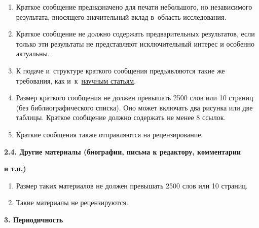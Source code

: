 \begin{enumerate} 

\item[1.] Краткое сообщение предназначено для печати небольшого, но независимого результата, вносящего значительный вклад в~область исследования.

\item[2.] Краткое сообщение не должно содержать предварительных результатов, если только эти результаты не представляют исключительный интерес и особенно актуальны.

\item[3.] К подаче и~структуре краткого сообщения предъявляются такие же требования, как и~к~\hyperlink{sectionPoliciesOriginalArticles}{научным статьям}.

\item[4.] Размер краткого сообщения не должен превышать 2500 слов или 10 страниц (без библиографического списка). Оно может включать два рисунка или две таблицы. Краткое сообщение должно содержать не менее 8 ссылок.



\item[5.] Краткие сообщения также отправляются на рецензирование.



\end{enumerate}



\pagebreak



{\bf 2.4. Другие материалы (биографии, письма к редактору, комментарии}



{\bf и т.п.)}



\begin{enumerate}

\item[1.] Размер таких материалов не должен превышать 2500 слов или 10 страниц.

\item[2.] Такие материалы не рецензируются. 

\end{enumerate}



\smallskip



\noindent

{\bf 3. Периодичность}



\smallskip



